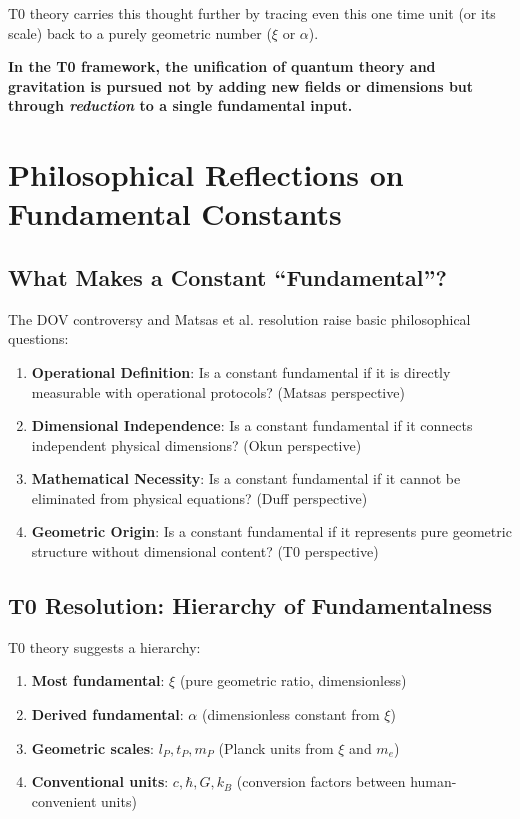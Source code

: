 	T0 theory carries this thought further by tracing even this one time unit (or its scale) back to a purely geometric number ($\xi$ or $\alpha$).
	
	\textbf{In the T0 framework, the unification of quantum theory and gravitation is pursued not by adding new fields or dimensions but through \emph{reduction} to a single fundamental input.}
	
	\section{Philosophical Reflections on Fundamental Constants}
	
	\subsection{What Makes a Constant ``Fundamental''?}
	
	The DOV controversy and Matsas et al. resolution raise basic philosophical questions:
	
	\begin{enumerate}
		\item \textbf{Operational Definition}: Is a constant fundamental if it is directly measurable with operational protocols? (Matsas perspective)
		
		\item \textbf{Dimensional Independence}: Is a constant fundamental if it connects independent physical dimensions? (Okun perspective)
		
		\item \textbf{Mathematical Necessity}: Is a constant fundamental if it cannot be eliminated from physical equations? (Duff perspective)
		
		\item \textbf{Geometric Origin}: Is a constant fundamental if it represents pure geometric structure without dimensional content? (T0 perspective)
	\end{enumerate}
	
	\subsection{T0 Resolution: Hierarchy of Fundamentalness}
	
	T0 theory suggests a hierarchy:
	
	\begin{enumerate}
		\item \textbf{Most fundamental}: $\xi$ (pure geometric ratio, dimensionless)
		
		\item \textbf{Derived fundamental}: $\alpha$ (dimensionless constant from $\xi$)
		
		\item \textbf{Geometric scales}: $l_P, t_P, m_P$ (Planck units from $\xi$ and $m_e$)
		
		\item \textbf{Conventional units}: $c, \hbar, G, k_B$ (conversion factors between human-convenient units)
	\end{enumerate}
	
